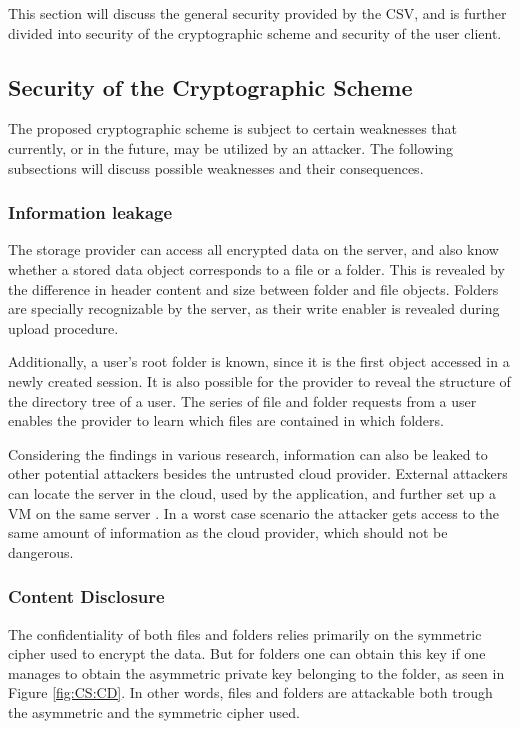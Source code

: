 \documentclass[pdftex,english,10pt,b5paper,twoside]{book}
\begin{document}
This section will discuss the general security provided by the \acl{CSV}, and
is further divided into security of the cryptographic scheme and security of
the user client.

\subsection{Security of the Cryptographic Scheme}

The proposed cryptographic scheme is subject to certain weaknesses that
currently, or in the future, may be utilized by an attacker. The following
subsections will discuss possible weaknesses and their consequences.

\subsubsection{Information leakage}

The storage provider can access all encrypted data on the server, and also know
whether a stored data object corresponds to a file or a folder. This is
revealed by the difference in header content and size between folder and file
objects. Folders are specially recognizable by the server, as their write
enabler is revealed during upload procedure. 

Additionally, a user's root folder is known, since it is the first object
accessed in a newly created session. It is also possible for the provider to
reveal the structure of the directory tree of a user. The series of file and
folder requests from a user enables the provider to learn which files are
contained in which folders.

Considering the findings in various research, information can also be leaked to
other potential attackers besides the untrusted cloud provider. External
attackers can locate the server in the cloud, used by the application, and
further set up a \ac{VM} on the same server \cite{cloud_getoff}. In a worst
case scenario the attacker gets access to the same amount of information as the
cloud provider, which should not be dangerous.

\subsubsection{Content Disclosure}

The confidentiality of both files and folders relies primarily on the symmetric
cipher used to encrypt the data. But for folders one can obtain this key if one
manages to obtain the asymmetric private key belonging to the folder, as seen
in Figure \ref{fig:CS:CD}. In other words, files and folders are attackable
both trough the asymmetric and the symmetric cipher used.
\end{document}
